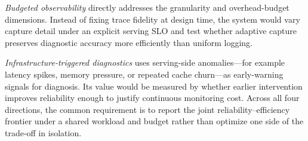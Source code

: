 \emph{Budgeted observability} directly addresses the granularity and overhead-budget dimensions. Instead of fixing trace fidelity at design time, the system would vary capture detail under an explicit serving SLO and test whether adaptive capture preserves diagnostic accuracy more efficiently than uniform logging.

\emph{Infrastructure-triggered diagnostics} uses serving-side anomalies---for example latency spikes, memory pressure, or repeated cache churn---as early-warning signals for diagnosis. Its value would be measured by whether earlier intervention improves reliability enough to justify continuous monitoring cost. Across all four directions, the common requirement is to report the joint reliability--efficiency frontier under a shared workload and budget rather than optimize one side of the trade-off in isolation.
